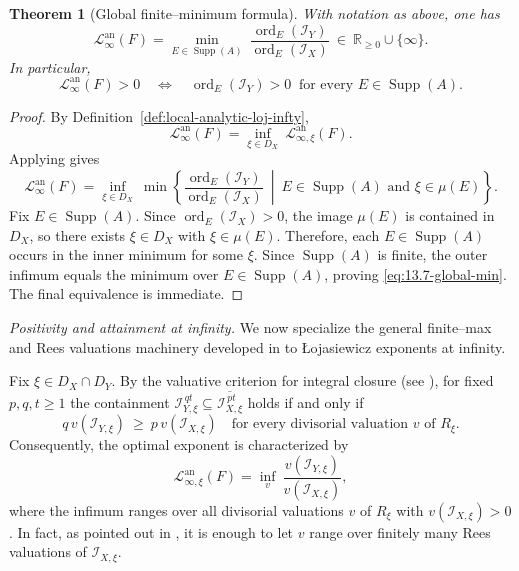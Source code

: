 \documentclass[12pt]{amsart}
\newcommand{\RR}{\mathbb{R}}
\newcommand{\Supp}{\operatorname{\mathrm{Supp}}}
\newcommand{\ord}{\operatorname{\mathrm{ord}}}
\newcommand{\Loj}{\mathcal{L}} %
\theoremstyle{plain}
\newtheorem{theorem}{Theorem}[section]
\theoremstyle{definition}
\numberwithin{equation}{section}
\begin{document}
\begin{theorem}[Global finite--minimum formula]\label{thm:13.2-global-min}
	With notation as above, one has
	\begin{equation}\label{eq:13.7-global-min}
		\Loj^{\text{an}}_\infty(F)
		=
		\min_{E\in \Supp(A)}\ \frac{\ord_E(\mathscr I_Y)}{\ord_E(\mathscr I_X)}
		\ \in\ \RR_{\ge 0}\cup\{\infty\}.
	\end{equation}
	In particular,
	\[
	\Loj^{\text{an}}_\infty(F)>0
	\quad\Longleftrightarrow\quad
	\ord_E(\mathscr I_Y)>0\ \text{ for every }E\in \Supp(A).
	\]
\end{theorem}

\begin{proof}
	By Definition~\ref{def:local-analytic-loj-infty},
	\[
	\Loj^{\text{an}}_\infty(F)=\inf_{\xi\in D_X}\ \Loj^{\text{an}}_{\infty,\xi}(F).
	\]
	Applying  gives
	\[
	\Loj^{\text{an}}_\infty(F)
	=
	\inf_{\xi\in D_X}\ 
	\min\left\{
	\frac{\ord_E(\mathscr I_Y)}{\ord_E(\mathscr I_X)}
	\ \middle|\
	E\in \Supp(A) \text{ and }\xi\in \mu(E)
	\right\}.
	\]
	Fix $E\in \Supp(A)$. Since $\ord_E(\mathscr I_X)>0$, the image $\mu(E)$ is contained in $D_X$,
	so there exists $\xi\in D_X$ with $\xi\in \mu(E)$. Therefore, each $E\in \Supp(A)$ occurs in the
	inner minimum for some $\xi$. Since $\Supp(A)$ is finite, the outer infimum equals the minimum over
	$E\in \Supp(A)$, proving \eqref{eq:13.7-global-min}. The final equivalence is immediate.
\end{proof}


\smallskip
\noindent\textit{Positivity and attainment at infinity.}
We now specialize the general finite--max and Rees valuations machinery developed in  to \L{}ojasiewicz exponents at infinity.

Fix $\xi\in D_X\cap D_Y$.
By the valuative criterion for integral closure (see ), for fixed $p,q,t\ge1$ the
containment $\mathscr I_{Y,\xi}^{\,qt}\subseteq \overline{\mathscr I_{X,\xi}^{\,pt}}$
holds if and only if 
$$q\,v(\mathscr I_{Y,\xi})\ \ge\ p\,v(\mathscr I_{X,\xi})
\quad\text{for every divisorial valuation }v\text{ of }R_\xi.$$
Consequently, the optimal exponent is characterized by
\begin{equation}\label{eq:meta-valuative-characterization}
	\Loj^{\text{an}}_{\infty,\xi}(F)
	=
	\inf_{v}\ \frac{v(\mathscr I_{Y,\xi})}{v(\mathscr I_{X,\xi})},
\end{equation}
where the infimum ranges over all divisorial valuations $v$ of $R_\xi$ with $v(\mathscr I_{X,\xi})>0$. In fact, as pointed out in , it is enough to let $v$ range over finitely many Rees valuations of $\mathscr I_{X,\xi}$.
\end{document}
